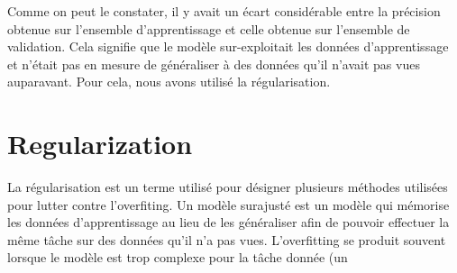 \documentclass[11pt]{article}
\begin{document}
Comme on peut le constater, il y avait un écart considérable entre la précision
obtenue sur l'ensemble d'apprentissage et celle obtenue sur l'ensemble de
validation. Cela signifie que le modèle sur-exploitait les données
d'apprentissage et n'était pas en mesure de généraliser à des données qu'il
n'avait pas vues auparavant. Pour cela, nous avons utilisé la régularisation.
\section{Regularization}
La régularisation est un terme utilisé pour désigner plusieurs méthodes
utilisées pour lutter contre l'overfiting. Un modèle surajusté est un modèle qui
mémorise les données d'apprentissage au lieu de les généraliser afin de pouvoir
effectuer la même tâche sur des données qu'il n'a pas vues. L'overfitting se
produit souvent lorsque le modèle est trop complexe pour la tâche donnée (un
\end{document}
